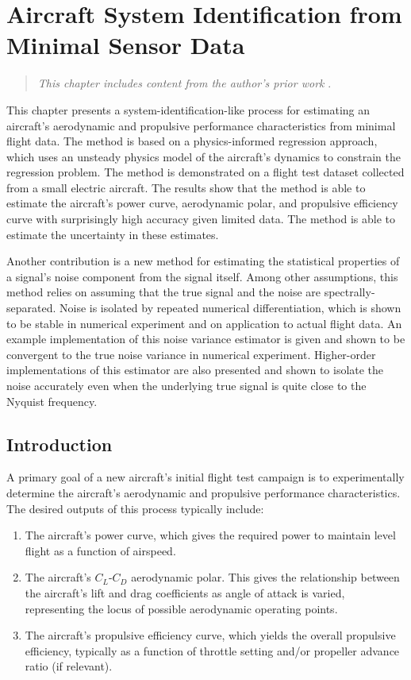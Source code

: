 \chapter{Aircraft System Identification from Minimal Sensor Data}
\label{chap:aircraft_sysid}

\begin{quote}
    \emph{This chapter includes content from the author's prior work} \cite{sharpe_physicsinformed_2024}.
\end{quote}

This chapter presents a system-identification-like process for estimating an aircraft's aerodynamic and propulsive performance characteristics from minimal flight data. The method is based on a physics-informed regression approach, which uses an unsteady physics model of the aircraft's dynamics to constrain the regression problem. The method is demonstrated on a flight test dataset collected from a small electric aircraft. The results show that the method is able to estimate the aircraft's power curve, aerodynamic polar, and propulsive efficiency curve with surprisingly high accuracy given limited data. The method is able to estimate the uncertainty in these estimates.

Another contribution is a new method for estimating the statistical properties of a signal's noise component from the signal itself. Among other assumptions, this method relies on assuming that the true signal and the noise are spectrally-separated. Noise is isolated by repeated numerical differentiation, which is shown to be stable in numerical experiment and on application to actual flight data. An example implementation of this noise variance estimator is given and shown to be convergent to the true noise variance in numerical experiment. Higher-order implementations of this estimator are also presented and shown to isolate the noise accurately even when the underlying true signal is quite close to the Nyquist frequency.


\section{Introduction}

A primary goal of a new aircraft's initial flight test campaign is to experimentally determine the aircraft's aerodynamic and propulsive performance characteristics. The desired outputs of this process typically include:

\begin{enumerate}
    \item The aircraft's power curve, which gives the required power to maintain level flight as a function of airspeed.
    \item The aircraft's $C_L$-$C_D$ aerodynamic polar. This gives the relationship between the aircraft's lift and drag coefficients as angle of attack is varied, representing the locus of possible aerodynamic operating points.
    \item The aircraft's propulsive efficiency curve, which yields the overall propulsive efficiency, typically as a function of throttle setting and/or propeller advance ratio (if relevant).
\end{enumerate}

